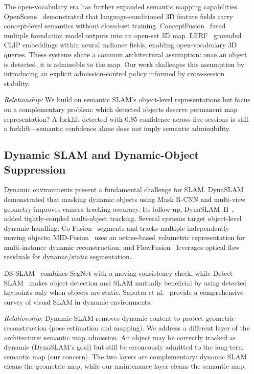 \documentclass[journal]{IEEEtran}
\begin{document}
The open-vocabulary era has further expanded semantic mapping capabilities. OpenScene~\cite{peng2023openscene} demonstrated that language-conditioned 3D feature fields carry concept-level semantics without closed-set training. ConceptFusion~\cite{jatavallabhula2023conceptfusion} fused multiple foundation model outputs into an open-set 3D map. LERF~\cite{kerr2023lerf} grounded CLIP embeddings within neural radiance fields, enabling open-vocabulary 3D queries. These systems share a common architectural assumption: once an object is detected, it is admissible to the map. Our work challenges this assumption by introducing an explicit admission-control policy informed by cross-session stability.

\textit{Relationship:} We build on semantic SLAM's object-level representations but focus on a complementary problem: which detected objects deserve permanent map representation? A forklift detected with 0.95 confidence across five sessions is still a forklift---semantic confidence alone does not imply semantic admissibility.

\subsection{Dynamic SLAM and Dynamic-Object Suppression}
\label{sec:related_dynamic}

Dynamic environments present a fundamental challenge for SLAM. DynaSLAM~\cite{bescos2018dynaslam} demonstrated that masking dynamic objects using Mask R-CNN and multi-view geometry improves camera tracking accuracy. Its follow-up, DynaSLAM~II~\cite{bescos2021dynaslam2}, added tightly-coupled multi-object tracking. Several systems target object-level dynamic handling: Co-Fusion~\cite{runz2017cofusion} segments and tracks multiple independently-moving objects; MID-Fusion~\cite{xu2019midfusion} uses an octree-based volumetric representation for multi-instance dynamic reconstruction; and FlowFusion~\cite{zhang2020flowfusion} leverages optical flow residuals for dynamic/static segmentation.

DS-SLAM~\cite{yu2018dsslam} combines SegNet with a moving-consistency check, while Detect-SLAM~\cite{zhong2018detectslam} makes object detection and SLAM mutually beneficial by using detected keypoints only when objects are static. Saputra et al.~\cite{saputra2018visualslam} provide a comprehensive survey of visual SLAM in dynamic environments.

\textit{Relationship:} Dynamic SLAM removes dynamic content to protect geometric reconstruction (pose estimation and mapping). We address a different layer of the architecture: semantic map admission. An object may be correctly tracked as dynamic (DynaSLAM's goal) but still be erroneously admitted to the long-term semantic map (our concern). The two layers are complementary: dynamic SLAM cleans the geometric map, while our maintenance layer cleans the semantic map.
\end{document}
